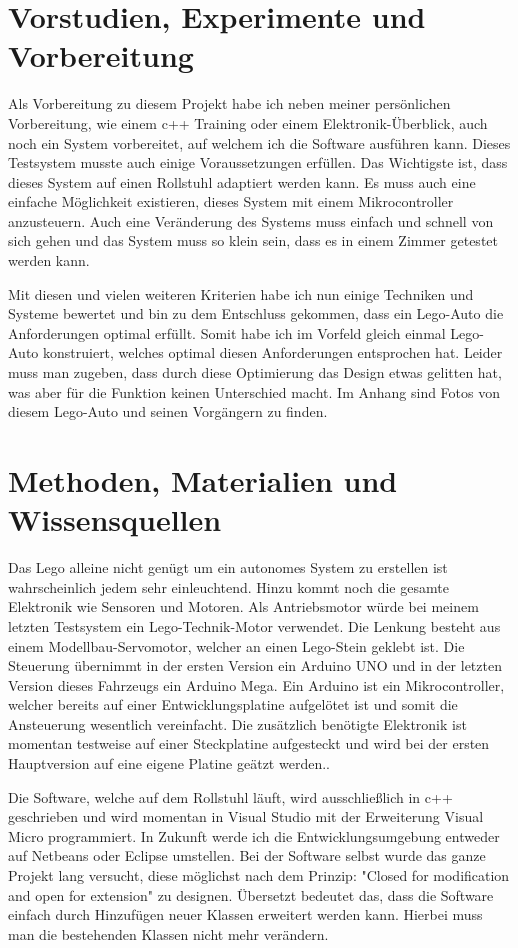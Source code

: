 \section{Vorstudien, Experimente und Vorbereitung}
Als Vorbereitung zu diesem Projekt habe ich neben meiner persönlichen Vorbereitung, wie einem c++ Training oder einem Elektronik-Überblick, auch noch ein System vorbereitet, auf welchem ich die Software ausführen kann.
Dieses Testsystem musste auch einige Voraussetzungen erfüllen.
Das Wichtigste ist, dass dieses System auf einen Rollstuhl adaptiert werden kann.
Es muss auch eine einfache Möglichkeit existieren, dieses System mit einem Mikrocontroller anzusteuern.
Auch eine Veränderung des Systems muss einfach und schnell von sich gehen und das System muss so klein sein, dass es in einem Zimmer getestet werden kann.

Mit diesen und vielen weiteren Kriterien habe ich nun einige Techniken und Systeme bewertet und bin zu dem Entschluss gekommen, dass ein Lego-Auto die Anforderungen optimal erfüllt.
Somit habe ich im Vorfeld gleich einmal Lego-Auto konstruiert, welches optimal diesen Anforderungen entsprochen hat.
Leider muss man zugeben, dass durch diese Optimierung das Design etwas gelitten hat, was aber für die Funktion keinen Unterschied macht.
Im Anhang sind Fotos von diesem Lego-Auto und seinen Vorgängern zu finden.



\section{Methoden, Materialien und Wissensquellen}
Das Lego alleine nicht genügt um ein autonomes System zu erstellen ist wahrscheinlich jedem sehr einleuchtend.
Hinzu kommt noch die gesamte Elektronik wie Sensoren und Motoren.
Als Antriebsmotor würde bei meinem letzten Testsystem ein Lego-Technik-Motor verwendet.
Die Lenkung besteht aus einem Modellbau-Servomotor, welcher an einen Lego-Stein geklebt ist.
Die Steuerung übernimmt in der ersten Version ein Arduino UNO und in der letzten Version dieses Fahrzeugs ein Arduino Mega.
Ein Arduino ist ein Mikrocontroller, welcher bereits auf einer Entwicklungsplatine aufgelötet ist und somit die Ansteuerung wesentlich vereinfacht.
Die zusätzlich benötigte Elektronik ist momentan testweise auf einer Steckplatine aufgesteckt und wird bei der ersten Hauptversion auf eine eigene Platine geätzt werden..

Die Software, welche auf dem Rollstuhl läuft, wird ausschließlich in c++ geschrieben und wird momentan in Visual Studio mit der Erweiterung Visual Micro programmiert.
In Zukunft werde ich die Entwicklungsumgebung entweder auf Netbeans oder Eclipse umstellen.
Bei der Software selbst wurde das ganze Projekt lang versucht, diese möglichst nach dem Prinzip: "Closed for modification and open for extension" zu designen.
Übersetzt bedeutet das, dass die Software einfach durch Hinzufügen neuer Klassen erweitert werden kann.
Hierbei muss man die bestehenden Klassen nicht mehr verändern.

